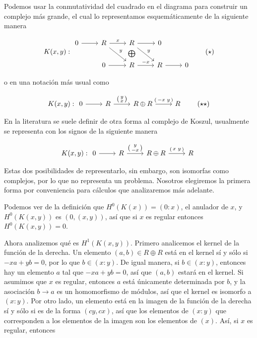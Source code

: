 Podemos usar la conmutatividad del cuadrado en el diagrama para construir un complejo más grande, el cual lo representamos esquemáticamente de la siguiente manera

\[
K(x,y):
\begin{tikzcd}
0\arrow[r,""] & R \arrow[r,"x"] \arrow[rd,"y"] & R \arrow[d,draw=none,"\bigoplus" description] \arrow[r,""] \arrow[rd,"y"] & 0\\
&0 \arrow[r,""] & R \arrow[r,"-x"] & R \arrow[r] & 0
\end{tikzcd} \label{complex2schema} \tag{$\star$}
\]

o en una notación más usual como 

\[
K(x,y):
\begin{tikzcd}[ampersand replacement=\&]
0 \ar[r] \& R \ar{r}{
\left( \begin{smallmatrix} y \\ x \end{smallmatrix} \right)
} \& R \oplus R \ar{r}{
\left( \begin{smallmatrix} -x & y \end{smallmatrix} \right)
} \& R
\end{tikzcd} \label{complex2common} \tag{$\star\star$}
\]

En la literatura se suele definir de otra forma al complejo de Koszul, usualmente se representa con los signos de la siguiente manera

\[
K(x,y):
\begin{tikzcd}[ampersand replacement=\&]
0 \ar[r] \& R \ar{r}{
\left( \begin{smallmatrix} y \\ -x \end{smallmatrix} \right)
} \& R \oplus R \ar{r}{
\left( \begin{smallmatrix} x & y \end{smallmatrix} \right)
} \& R
\end{tikzcd}
\]

Estas dos posibilidades de representarlo, sin embargo, son isomorfas como complejos, por lo que no representa un problema. Nosotros elegiremos la primera forma por conveniencia para cálculos que analizaremos más adelante.

Podemos ver de la definición que $H^0(K(x)) = (0:x)$, el anulador de $x$, y $H^0(K(x,y))$ es $(0, (x,y))$, así que si $x$ es regular entonces $H^0(K(x,y)) = 0$.

Ahora analizemos qué es $H^1(K(x,y))$. Primero analicemos el kernel de la función de la derecha. Un elemento $(a,b) \in R\oplus R$ está en el kernel sí y sólo si $-xa+yb = 0$, por lo que $b \in (x:y)$. De igual manera, si $b \in (x:y)$, entonces hay un elemento $a$ tal que $-xa + yb = 0$, así que $(a,b)$ estará en el kernel. Si asumimos que $x$ es regular, entonces $a$ está únicamente determinada por $b$, y la asociación $b\rightarrow a$ es un homomorfismo de módulos, así que el kernel es isomorfo a $(x:y)$.
Por otro lado, un elemento está en la imagen de la función de la derecha sí y sólo si es de la forma $(cy, cx)$, así que los elementos de $(x:y)$ que corresponden a los elementos de la imagen son los elementos de $(x)$. Así, si $x$ es regular, entonces

